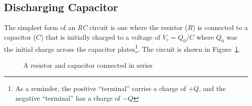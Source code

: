 \subsection{Discharging Capacitor}

The simplest form of an \emph{RC} circuit is one where the resistor ($R$) is
connected to a capacitor ($C$) that is initially charged to a voltage of
$V_c=Q_0/C$ where $Q_0$ was the initial charge across the capacitor
plates\footnote{As a reminder, the positive ``terminal'' carries a charge of
$+Q$, and the negative ``terminal'' has a charge of $-Q$}. The circuit is shown
in Figure~\ref{fig:RC1}.
\begin{figure}[ht]
  \centering
  \caption{A resistor and capacitor connected in series}
  \label{fig:RC1}
\end{figure}

